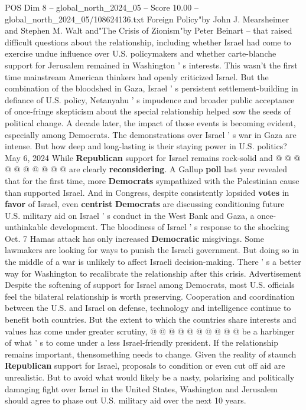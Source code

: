\begin{textsample}{POS Dim 8 – global\_north\_2024\_05 – Score 10.00 – global\_north\_2024\_05/108624136.txt}
Foreign Policy"by John J.
Mearsheimer and Stephen M.
Walt and"The Crisis of Zionism"by Peter Beinart -- that raised difficult questions about the relationship, including whether Israel had come to exercise undue influence over U.S. policymakers and whether carte-blanche support for Jerusalem remained in Washington ' s interests.
This wasn't the first time mainstream American thinkers had openly criticized Israel.
But the combination of the bloodshed in Gaza, Israel ' s persistent settlement-building in defiance of U.S. policy, Netanyahu ' s impudence and broader public acceptance of once-fringe skepticism about the special relationship helped sow the seeds of political change.
A decade later, the impact of those events is becoming evident, especially among Democrats.
The demonstrations over Israel ' s war in Gaza are intense.
But how deep and long-lasting is their staying power in U.S. politics?
May 6, 2024 While \textbf{Republican} support for Israel remains rock-solid and @ @ @ @ @ @ @ @ @ @ are clearly \textbf{reconsidering}.
A Gallup \textbf{poll} last year revealed that for the first time, more \textbf{Democrats} sympathized with the Palestinian cause than supported Israel.
And in Congress, despite consistently lopsided \textbf{votes} in \textbf{favor} of Israel, even \textbf{centrist} \textbf{Democrats} are discussing conditioning future U.S. military aid on Israel ' s conduct in the West Bank and Gaza, a once-unthinkable development.
The bloodiness of Israel ' s response to the shocking Oct. 7 Hamas attack has only increased \textbf{Democratic} misgivings.
Some lawmakers are looking for ways to punish the Israeli government.
But doing so in the middle of a war is unlikely to affect Israeli decision-making.
There ' s a better way for Washington to recalibrate the relationship after this crisis.
Advertisement Despite the softening of support for Israel among Democrats, most U.S. officials feel the bilateral relationship is worth preserving.
Cooperation and coordination between the U.S. and Israel on defense, technology and intelligence continue to benefit both countries.
But the extent to which the countries share interests and values has come under greater scrutiny, @ @ @ @ @ @ @ @ @ @ be a harbinger of what ' s to come under a less Israel-friendly president.
If the relationship remains important, thensomething needs to change.
Given the reality of staunch \textbf{Republican} support for Israel, proposals to condition or even cut off aid are unrealistic.
But to avoid what would likely be a nasty, polarizing and politically damaging fight over Israel in the United States, Washington and Jerusalem should agree to phase out U.S. military aid over the next 10 years.

\end{textsample}
